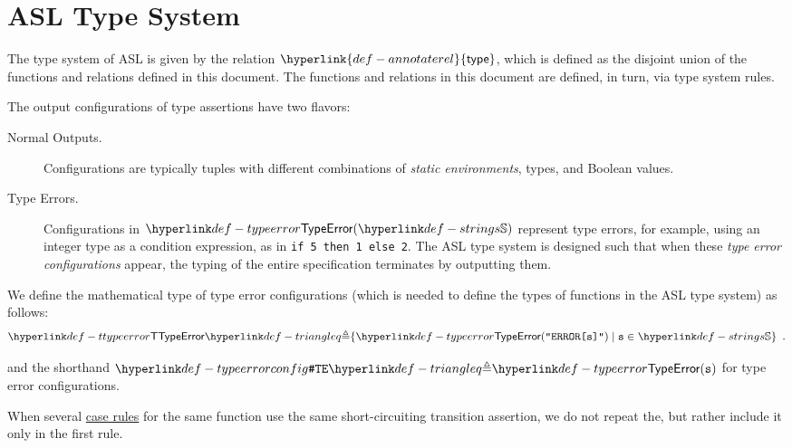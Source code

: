 \documentclass{book}
\newcommand\ProseOrTypeError[0]{\ProseTerminateAs{\TypeErrorConfig}}
\newcommand\annotaterel[0]{\hyperlink{def-annotaterel}{\textsf{type}}}
\begin{document}

\section{ASL Type System}
\hypertarget{def-annotaterel}{}
The type system of ASL is given by the relation $\annotaterel$, which is defined as the disjoint union
of the functions and relations defined in this document.
The functions and relations in this document are defined, in turn, via type system rules.

The output configurations of type assertions have two flavors:
\begin{description}
  \item[Normal Outputs.] \hypertarget{def-normal-type-outputs}{}
  Configurations are typically tuples with different combinations
  of \emph{static environments}, types, and Boolean values.

  \hypertarget{def-typeerror}{}
  \item[Type Errors.] Configurations in $\TypeError(\Strings)$
  represent type errors, for example, using an integer type as a condition expression, as in \verb|if 5 then 1 else 2|.
  The ASL type system is designed such that when these \emph{type error configurations} appear,
  the typing of the entire specification terminates by outputting them.
\end{description}

We define the mathematical type of type error configurations
(which is needed to define the types of functions in the ASL type system)
as follows:
\hypertarget{def-ttypeerror}{}
\[
  \TTypeError \triangleq \{\TypeErrorVal{\vs} \;|\; \vs \in \Strings \} \enspace.
\]

\hypertarget{def-typeerrorconfig}{}
and the shorthand $\TypeErrorConfig \triangleq \TypeError(\vs)$ for type error configurations.

%
When several \hyperlink{def-caserules}{case rules} for the same function use the same short-circuiting transition assertion,
we do not repeat the\ProseOrTypeError, but rather include it only in the first rule.
\end{document}
